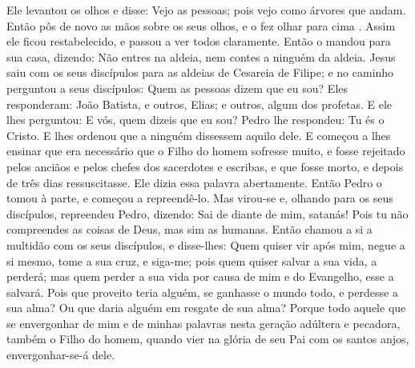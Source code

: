 {  Ele levantou os olhos e disse: Vejo as pessoas; pois vejo como árvores que andam.
  Então
{} pôs de novo as mãos sobre os seus olhos, e o fez olhar para cima . Assim ele ficou restabelecido, e passou a ver todos claramente.
  Então o mandou para sua casa, dizendo: Não entres na aldeia, nem contes a ninguém da aldeia.
  Jesus saiu com os seus discípulos para as aldeias de Cesareia de Filipe; e no caminho perguntou a seus discípulos: Quem as pessoas dizem que eu sou?
  Eles responderam: João Batista, e outros, Elias; e outros, algum dos profetas.
  E ele lhes perguntou: E vós, quem dizeis que eu sou? Pedro lhe respondeu: Tu és o Cristo.
  E lhes ordenou que a ninguém dissessem aquilo dele.
  E começou a lhes ensinar que era necessário que o Filho do homem sofresse muito, e fosse rejeitado pelos anciãos e pelos chefes dos sacerdotes e escribas, e que fosse morto, e depois de três dias ressuscitasse.
  Ele dizia essa palavra abertamente. Então Pedro o tomou à parte, e começou a repreendê-lo.
  Mas
{} virou-se e, olhando para os seus discípulos, repreendeu Pedro, dizendo: Sai de diante de mim, satanás! Pois tu não compreendes as coisas de Deus, mas sim as humanas.
  Então chamou a si a multidão com os seus discípulos, e disse-lhes: Quem quiser vir após mim, negue a si mesmo, tome a sua cruz, e siga-me;
  pois quem quiser salvar a sua vida, a perderá; mas quem perder a sua vida por causa de mim e do Evangelho, esse a salvará.
  Pois que proveito teria alguém, se ganhasse o mundo todo, e perdesse a sua alma?
  Ou que daria alguém em resgate de sua alma?
  Porque todo aquele que se envergonhar de mim e de minhas palavras nesta geração adúltera e pecadora, também o Filho do homem, quando vier na glória de seu Pai com os santos anjos, envergonhar-se-á dele.
\par }

